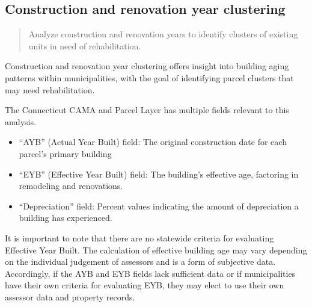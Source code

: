 \documentclass[
  letterpaper,
  DIV=11,
  numbers=noendperiod]{scrreprt}
\providecommand{\tightlist}{%
  \setlength{\itemsep}{0pt}\setlength{\parskip}{0pt}}
\begin{document}
\subsection{\texorpdfstring{\textbf{Construction and renovation year
clustering}}{Construction and renovation year clustering}}\label{construction-and-renovation-year-clustering}

\begin{quote}
Analyze construction and renovation years to identify clusters of
existing units in need of rehabilitation.
\end{quote}

Construction and renovation year clustering offers insight into building
aging patterns within municipalities, with the goal of identifying
parcel clusters that may need rehabilitation.

The Connecticut CAMA and Parcel Layer has multiple fields relevant to
this analysis.

\begin{itemize}
\tightlist
\item
  ``AYB'' (Actual Year Built) field: The original construction date for
  each parcel's primary building
\item
  ``EYB'' (Effective Year Built) field: The building's effective age,
  factoring in remodeling and renovations.
\item
  ``Depreciation'' field: Percent values indicating the amount of
  depreciation a building has experienced.
\end{itemize}

It is important to note that there are no statewide criteria for
evaluating Effective Year Built. The calculation of effective building
age may vary depending on the individual judgement of assessors and is a
form of subjective data. Accordingly, if the AYB and EYB fields lack
sufficient data or if municipalities have their own criteria for
evaluating EYB, they may elect to use their own assessor data and
property records.
\end{document}
